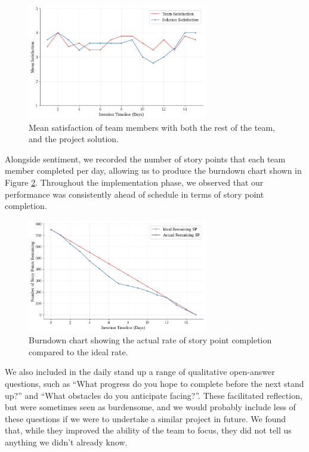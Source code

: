 \begin{figure}[h!]
	\centering
	\includegraphics[width=0.7\textwidth]{images/plot_satisfaction}
	\caption{Mean satisfaction of team members with both the rest of the team, and the project solution.}
	\label{fig:plot_satisfaction}
\end{figure}

\newpage
Alongside sentiment, we recorded the number of story points that each team member completed per day, allowing us to produce the burndown chart shown in Figure \ref{fig:plot_story_points}. Throughout the implementation phase, we observed that our performance was consistently ahead of schedule in terms of story point completion.

\begin{figure}[h!]
	\centering
	\includegraphics[width=0.7\textwidth]{images/plot_story_points}
	\caption{Burndown chart showing the actual rate of story point completion compared to the ideal rate.}
	\label{fig:plot_story_points}
\end{figure}

We also included in the daily stand up a range of qualitative open-answer questions, such as “What progress do you hope to complete before the next stand up?” and “What obstacles do you anticipate facing?”. These facilitated reflection, but were sometimes seen as burdensome, and we would probably include less of these questions if we were to undertake a similar project in future. We found that, while they improved the ability of the team to focus, they did not tell us anything we didn’t already know.


